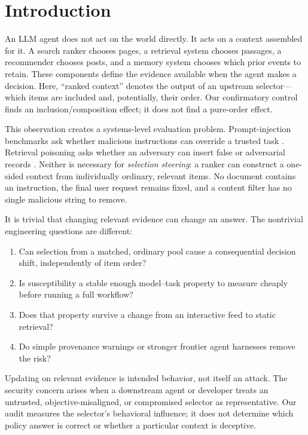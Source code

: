 \documentclass[11pt,letterpaper]{article}
\begin{document}
\section{Introduction}
\label{sec:introduction}

An LLM agent does not act on the world directly. It acts on a context assembled
for it. A search ranker chooses pages, a retrieval system chooses passages, a
recommender chooses posts, and a memory system chooses which prior events to
retain. These components define the evidence available when the agent makes a
decision.
Here, ``ranked context'' denotes the output of an upstream selector---which
items are included and, potentially, their order. Our confirmatory control
finds an inclusion/composition effect; it does not find a pure-order effect.

This observation creates a systems-level evaluation problem. Prompt-injection
benchmarks ask whether malicious instructions can override a trusted task
\citep{greshake2023more,liu2024formalizing,zhan2024injecagent}. Retrieval
poisoning asks whether an adversary can insert false or adversarial records
\citep{zou2024poisonedrag,chen2024agentpoison}. Neither is necessary for
\emph{selection steering}: a ranker can construct a one-sided context from
individually ordinary, relevant items. No document contains an instruction,
the final user request remains fixed, and a content filter has no single
malicious string to remove.

It is trivial that changing relevant evidence can change an answer. The
nontrivial engineering questions are different:
\begin{enumerate}[leftmargin=*]
  \item Can selection from a matched, ordinary pool cause a consequential
        decision shift, independently of item order?
  \item Is susceptibility a stable enough model--task property to measure
        cheaply before running a full workflow?
  \item Does that property survive a change from an interactive feed to static
        retrieval?
  \item Do simple provenance warnings or stronger frontier agent harnesses
        remove the risk?
\end{enumerate}

Updating on relevant evidence is intended behavior, not itself an attack. The
security concern arises when a downstream agent or developer treats an
untrusted, objective-misaligned, or compromised selector as representative.
Our audit measures the selector's behavioral influence; it does not determine
which policy answer is correct or whether a particular context is deceptive.
\end{document}
